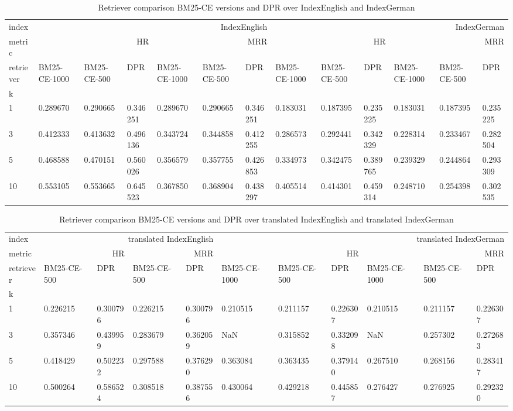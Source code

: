 \begin{table}
    \begin{tabular}{l*{12}{p{1.32cm}}}
        \toprule
        index & \multicolumn{6}{r}{IndexEnglish} & \multicolumn{6}{r}{IndexGerman} \\
        metric & \multicolumn{3}{r}{HR} & \multicolumn{3}{r}{MRR} & \multicolumn{3}{r}{HR} & \multicolumn{3}{r}{MRR} \\
        retriever & BM25-CE-1000 & BM25-CE-500 & DPR & BM25-CE-1000 & BM25-CE-500 & DPR & BM25-CE-1000 & BM25-CE-500 & DPR & BM25-CE-1000 & BM25-CE-500 & DPR \\
        k &  &  &  &  &  &  &  &  &  &  &  &  \\
        \midrule
        1 & 0.289670 & 0.290665 & 0.346251 & 0.289670 & 0.290665 & 0.346251 & 0.183031 & 0.187395 & 0.235225 & 0.183031 & 0.187395 & 0.235225 \\
        3 & 0.412333 & 0.413632 & 0.496136 & 0.343724 & 0.344858 & 0.412255 & 0.286573 & 0.292441 & 0.342329 & 0.228314 & 0.233467 & 0.282504 \\
        5 & 0.468588 & 0.470151 & 0.560026 & 0.356579 & 0.357755 & 0.426853 & 0.334973 & 0.342475 & 0.389765 & 0.239329 & 0.244864 & 0.293309 \\
        10 & 0.553105 & 0.553665 & 0.645523 & 0.367850 & 0.368904 & 0.438297 & 0.405514 & 0.414301 & 0.459314 & 0.248710 & 0.254398 & 0.302535 \\
        \bottomrule
    \end{tabular}
    \caption{Retriever comparison BM25-CE versions and DPR over IndexEnglish and IndexGerman}
\end{table}

\begin{table}
    \begin{tabular}{l*{10}{p{1.32cm}}}
        \toprule
        index & \multicolumn{4}{r}{translated IndexEnglish} & \multicolumn{6}{r}{translated IndexGerman} \\
        metric & \multicolumn{2}{r}{HR} & \multicolumn{2}{r}{MRR} & \multicolumn{3}{r}{HR} & \multicolumn{3}{r}{MRR} \\
        retriever & BM25-CE-500 & DPR & BM25-CE-500 & DPR & BM25-CE-1000 & BM25-CE-500 & DPR & BM25-CE-1000 & BM25-CE-500 & DPR \\
        k &  &  &  &  &  &  &  &  &  &  \\
        \midrule
        1 & 0.226215 & 0.300796 & 0.226215 & 0.300796 & 0.210515 & 0.211157 & 0.226307 & 0.210515 & 0.211157 & 0.226307 \\
        3 & 0.357346 & 0.439959 & 0.283679 & 0.362059 & NaN & 0.315852 & 0.332098 & NaN & 0.257302 & 0.272683 \\
        5 & 0.418429 & 0.502232 & 0.297588 & 0.376290 & 0.363084 & 0.363435 & 0.379140 & 0.267510 & 0.268156 & 0.283417 \\
        10 & 0.500264 & 0.586524 & 0.308518 & 0.387556 & 0.430064 & 0.429218 & 0.445857 & 0.276427 & 0.276925 & 0.292320 \\
        \bottomrule
    \end{tabular}
    \caption{Retriever comparison BM25-CE versions and DPR over translated IndexEnglish and translated IndexGerman}
\end{table}

